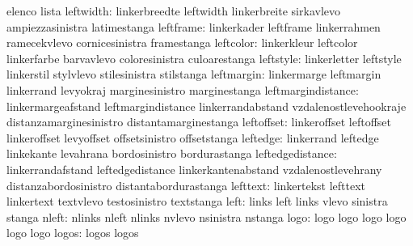                            elenco                    lista
                leftwidth: linkerbreedte             leftwidth
                           linkerbreite              sirkavlevo
                           ampiezzasinistra          latimestanga
                leftframe: linkerkader               leftframe
                           linkerrahmen              ramecekvlevo
                           cornicesinistra           framestanga
                leftcolor: linkerkleur               leftcolor
                           linkerfarbe               barvavlevo
                           coloresinistra            culoarestanga
                leftstyle: linkerletter              leftstyle
                           linkerstil                stylvlevo
                           stilesinistra             stilstanga
               leftmargin: linkermarge               leftmargin
                           linkerrand                levyokraj
                           marginesinistro           marginestanga
       leftmargindistance: linkermargeafstand        leftmargindistance
                           linkerrandabstand         vzdalenostlevehookraje
                           distanzamarginesinistro   distantamarginestanga
               leftoffset: linkeroffset              leftoffset
                           linkeroffset              levyoffset
                           offsetsinistro            offsetstanga
                 leftedge: linkerrand                leftedge
                           linkekante                levahrana
                           bordosinistro             bordurastanga
         leftedgedistance: linkerrandafstand         leftedgedistance
                           linkerkantenabstand       vzdalenostlevehrany
                           distanzabordosinistro     distantabordurastanga
                 lefttext: linkertekst               lefttext
                           linkertext                textvlevo
                           testosinistro             textstanga %
                     left: links                     left
                           links                     vlevo
                           sinistra                  stanga
                    nleft: nlinks                    nleft
                           nlinks                    nvlevo
                           nsinistra                 nstanga
                     logo: logo                      logo
                           logo                      logo
                           logo                      logo
                    logos: logos                     logos
